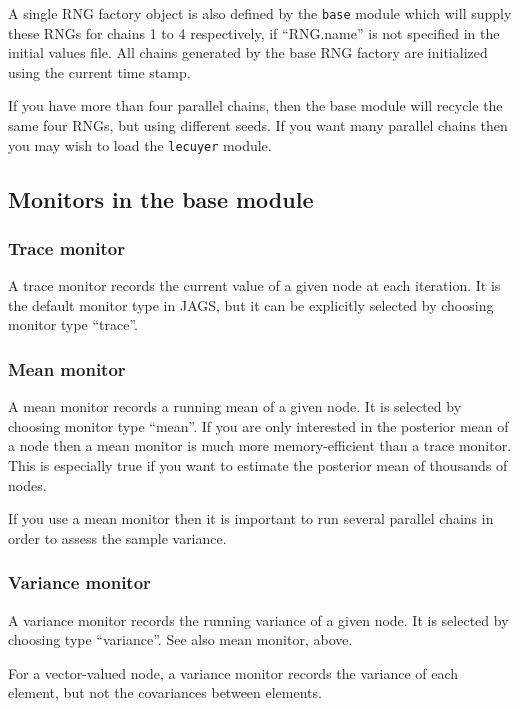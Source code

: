\documentclass[11pt, a4paper, titlepage]{report}
\newcommand{\JAGS}{\textsf{JAGS}}
\begin{document}
A single RNG factory object is also defined by the \texttt{base}
module which will supply these RNGs for chains 1 to 4 respectively, if
``RNG.name'' is not specified in the initial values file.  All chains
generated by the base RNG factory are initialized using the current
time stamp.

If you have more than four parallel chains, then the base module will
recycle the same four RNGs, but using different seeds. If you want
many parallel chains then you may wish to load the \verb+lecuyer+
module.


\subsection{Monitors in the base module}
\label{section:base:monitors}

\subsubsection{Trace monitor}

A trace monitor records the current value of a given node at each
iteration. It is the default monitor type in \JAGS, but it can be
explicitly selected by choosing monitor type ``trace''.

\subsubsection{Mean monitor}

A mean monitor records a running mean of a given node. It is selected
by choosing monitor type ``mean''. If you are only interested in the
posterior mean of a node then a mean monitor is much more
memory-efficient than a trace monitor. This is especially true if you
want to estimate the posterior mean of thousands of nodes.

If you use a mean monitor then it is important to run several parallel
chains in order to assess the sample variance.

\subsubsection{Variance monitor}

A variance monitor records the running variance of a given node. It is
selected by choosing type ``variance''. See also mean monitor, above.

For a vector-valued node, a variance monitor records the variance of
each element, but not the covariances between elements.
\end{document}
